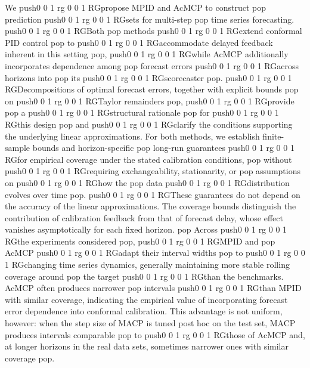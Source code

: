 \documentclass[
  american,
  12pt]{article}
\theoremstyle{plain}
\theoremstyle{plain}
\theoremstyle{remark}
\newcommand{\CPTSadd}[1]{\ifmmode\else\leavevmode\fi\pdfcolorstack 0 push{0 0 1 rg 0 0 1 RG}#1\pdfcolorstack 0 pop}
\begin{document}
We \CPTSadd{propose MPID and AcMCP to construct} prediction \CPTSadd{sets for multi-step}
time series forecasting. \CPTSadd{Both} methods \CPTSadd{extend conformal PID control
\citep{angelopoulos2024}} to \CPTSadd{accommodate delayed feedback inherent in
this setting}, \CPTSadd{while AcMCP additionally incorporates dependence among}
forecast errors \CPTSadd{across horizons into} its \CPTSadd{scorecaster}. \CPTSadd{Decompositions of
optimal forecast errors, together with explicit bounds} on \CPTSadd{Taylor
remainders}, \CPTSadd{provide} a \CPTSadd{structural rationale} for \CPTSadd{this design} and \CPTSadd{clarify
the conditions supporting the underlying linear approximations. For both
methods, we establish finite-sample bounds and horizon-specific} long-run
guarantees \CPTSadd{for empirical coverage under the stated calibration
conditions,} without \CPTSadd{requiring exchangeability, stationarity, or}
assumptions on \CPTSadd{how the} data \CPTSadd{distribution evolves over time}. \CPTSadd{These
guarantees do not depend on the accuracy of the linear approximations.
The coverage bounds distinguish the contribution of calibration feedback
from that of forecast delay, whose effect vanishes asymptotically for
each fixed horizon.} Across \CPTSadd{the experiments considered}, \CPTSadd{MPID and} AcMCP
\CPTSadd{adapt their interval widths} to \CPTSadd{changing time series dynamics, generally
maintaining more stable rolling coverage around} the target \CPTSadd{than the
benchmarks. AcMCP often produces narrower} intervals \CPTSadd{than MPID with
similar coverage, indicating the empirical value of incorporating
forecast error dependence into conformal calibration. This advantage is
not uniform, however: when the step size of MACP is tuned post hoc on
the test set, MACP produces intervals comparable} to \CPTSadd{those of AcMCP and,
at longer horizons in the real data sets, sometimes narrower ones with
similar coverage}.
\end{document}
